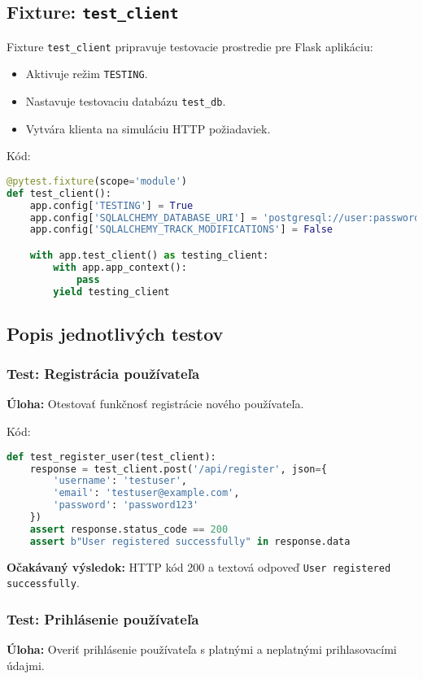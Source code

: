 \documentclass{article}
\begin{document}
\subsection*{Fixture: \texttt{test\_client}}
Fixture \texttt{test\_client} pripravuje testovacie prostredie pre Flask aplikáciu:
\begin{itemize}
    \item Aktivuje režim \texttt{TESTING}.
    \item Nastavuje testovaciu databázu \texttt{test\_db}.
    \item Vytvára klienta na simuláciu HTTP požiadaviek.
\end{itemize}
Kód:
\begin{lstlisting}[language=Python]
@pytest.fixture(scope='module')
def test_client():
    app.config['TESTING'] = True
    app.config['SQLALCHEMY_DATABASE_URI'] = 'postgresql://user:password@localhost/test_db'
    app.config['SQLALCHEMY_TRACK_MODIFICATIONS'] = False

    with app.test_client() as testing_client:
        with app.app_context():
            pass
        yield testing_client
\end{lstlisting}

\subsection{Popis jednotlivých testov}

\subsubsection{Test: Registrácia používateľa}
\textbf{Úloha:} Otestovať funkčnosť registrácie nového používateľa.

Kód:
\begin{lstlisting}[language=Python]
def test_register_user(test_client):
    response = test_client.post('/api/register', json={
        'username': 'testuser',
        'email': 'testuser@example.com',
        'password': 'password123'
    })
    assert response.status_code == 200
    assert b"User registered successfully" in response.data
\end{lstlisting}
\textbf{Očakávaný výsledok:} HTTP kód 200 a textová odpoveď \texttt{User registered successfully}.

\subsubsection{Test: Prihlásenie používateľa}
\textbf{Úloha:} Overiť prihlásenie používateľa s platnými a neplatnými prihlasovacími údajmi.
\end{document}
